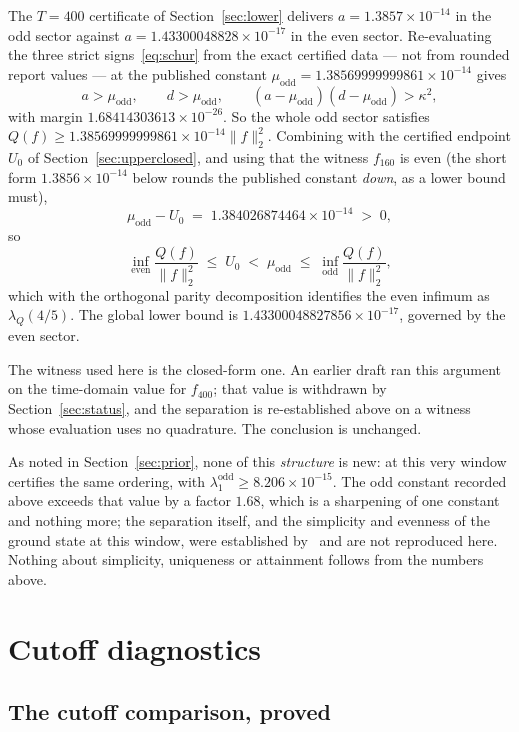 \documentclass[11pt,a4paper]{article}
\theoremstyle{definition}
\theoremstyle{remark}
\newcommand{\lQ}{\lambda_{Q}}
\begin{document}
The $T = 400$ certificate of Section~\ref{sec:lower} delivers
$a = 1.3857\times10^{-14}$ in the odd sector against
$a = 1.43300048828\times10^{-17}$ in the even sector.
Re-evaluating the three strict signs~\eqref{eq:schur} from the exact certified
data --- not from rounded report values --- at the published constant
$\mu_{\mathrm{odd}} = 1.38569999999861\times10^{-14}$ gives
\[
   a > \mu_{\mathrm{odd}},\qquad d > \mu_{\mathrm{odd}},\qquad
   (a - \mu_{\mathrm{odd}})(d - \mu_{\mathrm{odd}}) > \kappa^2 ,
\]
with margin $1.68414303613\times10^{-26}$. So the whole odd sector satisfies
$Q(f) \ge 1.38569999999861\times10^{-14}\|f\|_2^2$. Combining with the certified endpoint $U_0$
of Section~\ref{sec:upperclosed}, and using that the witness $f_{160}$ is even
(the short form $1.3856\times10^{-14}$ below rounds the published constant
\emph{down}, as a lower bound must),
\[
   \mu_{\mathrm{odd}} - U_0 \;=\; 1.384026874464\times10^{-14}
   \;>\; 0 ,
\]
so
\[
   \inf_{\text{even}} \frac{Q(f)}{\|f\|_2^2} \;\le\; U_0 \;<\;
   \mu_{\mathrm{odd}} \;\le\; \inf_{\text{odd}} \frac{Q(f)}{\|f\|_2^2},
\]
which with the orthogonal parity decomposition identifies the even infimum as
$\lQ(4/5)$. The global lower bound is $1.43300048827856\times10^{-17}$, governed by the
even sector.

The witness used here is the closed-form one. An earlier draft ran this argument
on the time-domain value for $f_{400}$; that value is withdrawn by
Section~\ref{sec:status}, and the separation is re-established above on a
witness whose evaluation uses no quadrature. The conclusion is unchanged.

As noted in Section~\ref{sec:prior}, none of this \emph{structure} is new: at
this very window \cite[Thm.~6.2]{Zhu} certifies the same ordering, with
$\lambda^{\mathrm{odd}}_1 \ge 8.206\times10^{-15}$. The odd constant recorded
above exceeds that value by a factor $1.68$, which is a sharpening of one
constant and nothing more; the separation itself, and the simplicity and
evenness of the ground state at this window, were established
by~\cite[Thm.~6.2]{Zhu} and are not reproduced here. Nothing about simplicity,
uniqueness or attainment follows from the numbers above.

\section{Cutoff diagnostics}
\label{sec:cutoff}

\subsection{The cutoff comparison, proved}
\end{document}
